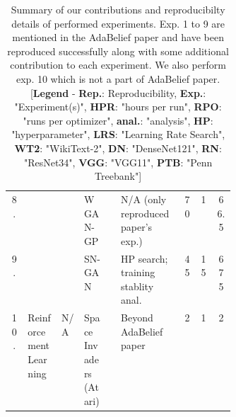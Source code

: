 \begin{table}[t]
{\begin{tabular}{c  p{0.15\linewidth}  p{0.1\linewidth}  p{0.12\linewidth}  c  l  c  c  c}
		\cline{4-9}
		8. \rule{0pt}{9pt} & &   & WGAN-GP & \textcolor{green}{\checkmark} & N/A (only reproduced paper's \cite{zhuang_adabelief_2020} exp.) & 70 & 1 & 66.5 \\

		\cline{4-9}
		9. \rule{0pt}{9pt} & &   & SN-GAN & \textcolor{green}{\checkmark} & HP search; training stablity anal. & 45 & 15 & 675 \\

		\hline
		10. & Reinforcement Learning & N/A & Space Invaders (Atari) & \textcolor{green}{\checkmark} & Beyond AdaBelief paper \cite{zhuang_adabelief_2020} & 2 & 1 & 2 \\

		\hline
		\end{tabular}
		}

		\vspace{2mm}
		\caption{Summary of our contributions and reproducibilty details of performed experiments. Exp. 1 to 9 are mentioned in the AdaBelief paper \cite{zhuang_adabelief_2020} and have been reproduced successfully along with some additional contribution to each experiment. We also perform exp. 10 which is not a part of AdaBelief paper.\hspace{\textwidth} [\textbf{Legend} - \textbf{Rep.}: Reproducibility, \textbf{Exp.}: "Experiment(s)", \textbf{HPR}: "hours per run", \textbf{RPO}: "runs per optimizer", \textbf{anal.}: "analysis", \textbf{HP}: "hyperparameter", \textbf{LRS}: "Learning Rate Search", \textbf{WT2}: "WikiText-2", \textbf{DN}: "DenseNet121", \textbf{RN}: "ResNet34", \textbf{VGG}: "VGG11", \textbf{PTB}: "Penn Treebank"]}
		\label{table:our_contribution}
\end{table}



